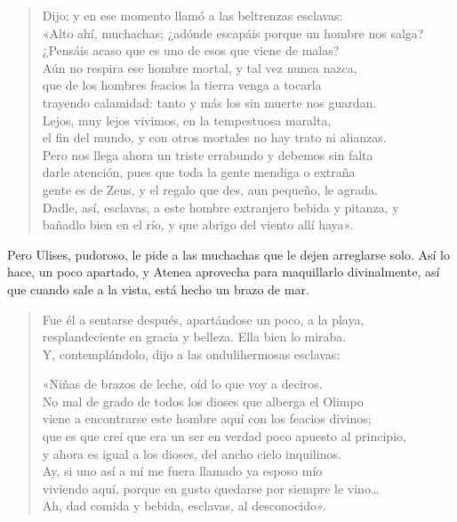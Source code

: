 \begin{verse}
Dijo; y en ese momento llamó a las beltrenzas esclavas:\\
«Alto ahí, muchachas; ¿adónde escapáis porque un hombre nos salga?\\
¿Pensáis acaso que es uno de esos que viene de malas?\\
Aún no respira ese hombre mortal, y tal vez nunca nazca,\\
que de los hombres feacios la tierra venga a tocarla\\
trayendo calamidad: tanto y más los sin muerte nos guardan.\\
Lejos, muy lejos vivimos, en la tempestuosa maralta,\\
el fin del mundo, y con otros mortales no hay trato ni alianzas.\\
Pero nos llega ahora un triste errabundo y debemos sin falta\\
darle atención, pues que toda la gente mendiga o extraña\\
gente es de Zeus, y el regalo que des, aun pequeño, le agrada.\\
Dadle, así, esclavas, a este hombre extranjero bebida y pitanza, y\\
bañadlo bien en el río, y que abrigo del viento allí haya».
\end{verse}

Pero Ulises, pudoroso, le pide a las muchachas que le dejen arreglarse solo. Así lo hace, un poco apartado, y Atenea aprovecha para maquillarlo divinalmente, así que cuando sale a la vista, está hecho un brazo de mar.


\begin{verse}
Fue él a sentarse después, apartándose un poco, a la playa,\\
resplandeciente en gracia y belleza. Ella bien lo miraba.\\
Y, contemplándolo, dijo a las ondulihermosas esclavas:

«Niñas de brazos de leche, oíd lo que voy a deciros.\\
No mal de grado de todos los dioses que alberga el Olimpo\\
viene a encontrarse este hombre aquí con los feacios divinos;\\
que es que creí que era un ser en verdad poco apuesto al principio,\\
y ahora es igual a los dioses, del ancho cielo inquilinos.\\
Ay, si uno así a mí me fuera llamado ya esposo mío\\
viviendo aquí, porque en gusto quedarse por siempre le vino…\\
Ah, dad comida y bebida, esclavas, al desconocido».
\end{verse}

